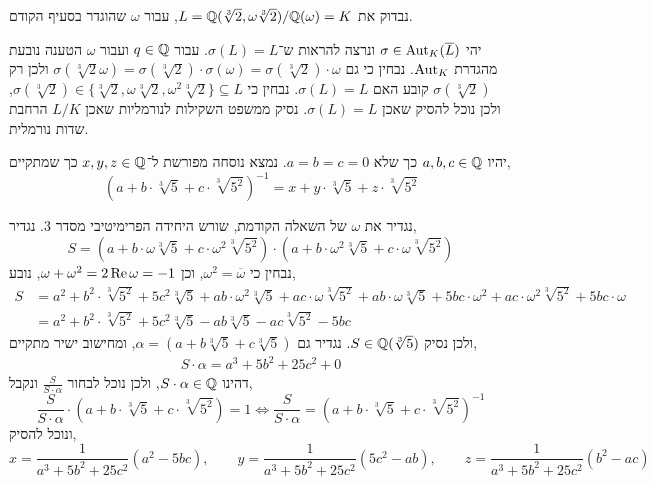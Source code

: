 \subquestion{}
נבדוק את $L = \mathbb{Q}(\sqrt[3]{2}, \omega \sqrt[3]{2}) / \mathbb{Q}(\omega) = K$, עבור $\omega$ שהוגדר בסעיף הקודם.
\begin{solution}
	יהי $\sigma \in \operatorname{Aut}_K(\overline{L})$ ונרצה להראות ש־$\sigma(L) = L$.
	עבור $q \in \mathbb{Q}$ ועבור $\omega$ הטענה נובעת מהגדרת $\operatorname{Aut}_K$.
	נבחין כי גם $\sigma(\sqrt[3]{2} \omega) = \sigma(\sqrt[3]{2}) \cdot \sigma(\omega) = \sigma(\sqrt[3]{2}) \cdot \omega$ ולכן רק $\sigma(\sqrt[3]{2})$ קובע האם $\sigma(L) = L$.
	נבחין כי $\sigma(\sqrt[3]{2}) \in \{ \sqrt[3]{2}, \omega \sqrt[3]{2}, \omega^2 \sqrt[3]{2} \} \subseteq L$, ולכן נוכל להסיק שאכן $\sigma(L) = L$.
	נסיק ממשפט השקילות לנורמליות שאכן $L / K$ הרחבת שדות נורמלית.
\end{solution}

\question{}
יהיו $a, b, c \in \mathbb{Q}$ כך שלא $a = b = c = 0$.
נמצא נוסחה מפורשת ל־$x, y, z \in \mathbb{Q}$ כך שמתקיים,
\[
	{(a + b \cdot \sqrt[3]{5} + c \cdot \sqrt[3]{5^2})}^{-1}
	= x + y \cdot \sqrt[3]{5} + z \cdot \sqrt[3]{5^2}
\]
\begin{solution}
	נגדיר את $\omega$ של השאלה הקודמת, שורש היחידה הפרימיטיבי מסדר 3.
	נגדיר,
	\[
		S
		= (a + b \cdot \omega \sqrt[3]{5} + c \cdot \omega^2 \sqrt[3]{5^2}) \cdot (a + b \cdot \omega^2 \sqrt[3]{5} + c \cdot \omega \sqrt[3]{5^2})
	\]
	נבחין כי $\omega^2 = \overline{\omega}$, וכן $\omega + \omega^2 = 2 \operatorname{Re} \omega = -1$, נובע,
	\begin{align*}
		S & = a^2 + b^2 \cdot \sqrt[3]{5^2} + 5 c^2 \sqrt[3]{5}
		+ a b \cdot \omega^2 \sqrt[3]{5} + a c \cdot \omega \sqrt[3]{5^2}
		+ a b \cdot \omega \sqrt[3]{5} + 5 b c \cdot \omega^2
		+ a c \cdot \omega^2 \sqrt[3]{5^2} + 5 b c \cdot \omega \\
		& = a^2 + b^2 \cdot \sqrt[3]{5^2} + 5 c^2 \sqrt[3]{5}
		- a b \sqrt[3]{5} - a c \sqrt[3]{5^2} - 5 b c
	\end{align*}
	ולכן נסיק $S \in \mathbb{Q}(\sqrt[3]{5})$.
	נגדיר גם $\alpha = (a + b \sqrt[3]{5} + c \sqrt[3]{5})$, ומחישוב ישיר מתקיים,
	\begin{align*}
		S \cdot \alpha
		= a^3 + 5 b^2 + 25 c^2 + 0
	\end{align*}
	דהינו $S \cdot \alpha \in \mathbb{Q}$, ולכן נוכל לבחור $\frac{S}{S \cdot \alpha}$ ונקבל,
	\[
		\frac{S}{S \cdot \alpha}
		\cdot (a + b \cdot \sqrt[3]{5} + c \cdot \sqrt[3]{5^2})
		= 1
		\iff
		\frac{S}{S \cdot \alpha}
		= {(a + b \cdot \sqrt[3]{5} + c \cdot \sqrt[3]{5^2})}^{-1}
	\]
	ונוכל להסיק,
	\[
		x = \frac{1}{a^3 + 5 b^2 + 25 c^2} (a^2 - 5 b c),
		\qquad
		y = \frac{1}{a^3 + 5 b^2 + 25 c^2} (5 c^2 - a b),
		\qquad
		z = \frac{1}{a^3 + 5 b^2 + 25 c^2} (b^2 - a c)
	\]
\end{solution}


